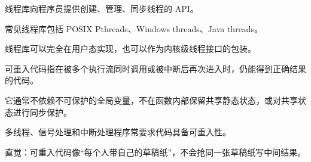 \begin{points}
  \item 线程库向程序员提供创建、管理、同步线程的 API。
  \item 常见线程库包括 POSIX Pthreads、Windows threads、Java threads。
  \item 线程库可以完全在用户态实现，也可以作为内核级线程接口的包装。
\end{points}


\begin{points}
  \item 可重入代码指在被多个执行流同时调用或被中断后再次进入时，仍能得到正确结果的代码。
  \item 它通常不依赖不可保护的全局变量，不在函数内部保留共享静态状态，或对共享状态进行同步保护。
  \item 多线程、信号处理和中断处理程序常要求代码具备可重入性。
  \item 直觉：可重入代码像“每个人带自己的草稿纸”，不会抢同一张草稿纸写中间结果。
\end{points}


